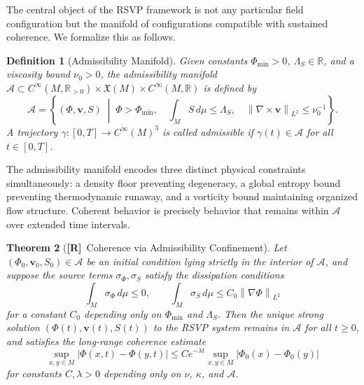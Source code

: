 \documentclass[11pt, oneside]{article}
\numberwithin{equation}{section}
\newcommand{\ClaimR}{\textcolor{rsvpblue}{\textbf{[R]}}}
\theoremstyle{rsvpstyle}
\newtheorem{theorem}{Theorem}[section]
\newtheorem{definition}[theorem]{Definition}
\theoremstyle{remark}
\newcommand{\vfield}{\mathbf{v}}
\newcommand{\Adm}{\mathcal{A}}
\newcommand{\Rspace}{\mathbb{R}}
\newcommand{\norm}[1]{\left\lVert #1 \right\rVert}
\newcommand{\grad}{\nabla}
\begin{document}
The central object of the RSVP framework is not any particular field configuration but
the manifold of configurations compatible with sustained coherence. We formalize this
as follows.

\begin{definition}[Admissibility Manifold]
Given constants $\Phi_\text{min} > 0$, $\Lambda_S \in \Rspace$, and a viscosity
bound $\nu_0 > 0$, the admissibility manifold $\Adm \subset C^\infty(M, \Rspace_{>0})
\times \mathfrak{X}(M) \times C^\infty(M, \Rspace)$ is defined by
\begin{equation}
  \Adm = \left\{ (\Phi, \vfield, S) \;\middle|\;
    \Phi > \Phi_\text{min},\quad
    \int_M S \,d\mu \leq \Lambda_S,\quad
    \norm{\grad \times \vfield}_{L^2} \leq \nu_0^{-1}
  \right\}.
\end{equation}
A trajectory $\gamma : [0,T] \to C^\infty(M)^3$ is called admissible if $\gamma(t) \in
\Adm$ for all $t \in [0,T]$.
\end{definition}

The admissibility manifold encodes three distinct physical constraints simultaneously:
a density floor preventing degeneracy, a global entropy bound preventing thermodynamic
runaway, and a vorticity bound maintaining organized flow structure. Coherent behavior
is precisely behavior that remains within $\Adm$ over extended time intervals.

\begin{theorem}[\ClaimR\ Coherence via Admissibility Confinement]
\label{thm:coherence}
Let $(\Phi_0, \vfield_0, S_0) \in \Adm$ be an initial condition lying strictly in the
interior of $\Adm$, and suppose the source terms $\sigma_\Phi, \sigma_S$ satisfy the
dissipation conditions
\begin{equation}
  \int_M \sigma_\Phi \,d\mu \leq 0, \qquad
  \int_M \sigma_S \,d\mu \leq C_0 \norm{\grad \Phi}_{L^2}
\end{equation}
for a constant $C_0$ depending only on $\Phi_\text{min}$ and $\Lambda_S$. Then the
unique strong solution $(\Phi(t), \vfield(t), S(t))$ to the RSVP system remains in
$\Adm$ for all $t \geq 0$, and satisfies the long-range coherence estimate
\begin{equation}
  \sup_{x,y \in M} \left| \Phi(x,t) - \Phi(y,t) \right| \leq C e^{-\lambda t}
  \sup_{x,y \in M} \left| \Phi_0(x) - \Phi_0(y) \right|
\end{equation}
for constants $C, \lambda > 0$ depending only on $\nu$, $\kappa$, and $\Adm$.
\end{theorem}
\end{document}
